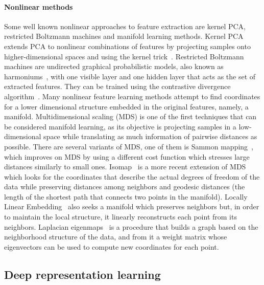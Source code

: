 \documentclass[
	fontsize=11pt, %
	twoside=false, %
	open=any, %
	secnumdepth=1, %
]{kaobook}
\begin{document}
\paragraph{Nonlinear methods} Some well known nonlinear approaches to feature extraction are kernel PCA, restricted Boltzmann machines and manifold learning methods. Kernel PCA~\cite{KernelPCA} extends PCA to nonlinear combinations of features by projecting samples onto higher-dimensional spaces and using the kernel trick~\cite{kernelmethods}. Restricted Boltzmann machines are undirected graphical probabilistic models, also known as harmoniums~\cite{Harmonium}, with one visible layer and one hidden layer that acts as the set of extracted features. They can be trained using the contrastive divergence algorithm~\cite{ContrastiveDivergence}. Many nonlinear feature learning methods attempt to find coordinates for a lower dimensional structure embedded in the original features, namely, a manifold. Multidimensional scaling (MDS) is one of the first techniques that can be considered manifold learning, as its objective is projecting samples in a low-dimensional space while translating as much information of pairwise distances as possible. There are several variants of MDS, one of them is Sammon mapping~\cite{Sammon}, which improves on MDS by using a different cost function which stresses large distances similarly to small ones. Isomap~\cite{Isomap} is a more recent extension of MDS which looks for the coordinates that describe the actual degrees of freedom of the data while preserving distances among neighbors and geodesic distances (the length of the shortest path that connects two points in the manifold). Locally Linear Embedding~\cite{LLE} also seeks a manifold which preserves neighbors but, in order to maintain the local structure, it linearly reconstructs each point from its neighbors. Laplacian eigenmaps~\cite{LaplacianEigenmaps} is a procedure that builds a graph based on the neighborhood structure of the data, and from it a weight matrix whose eigenvectors can be used to compute new coordinates for each point.

\subsection{Deep representation learning}
\end{document}
